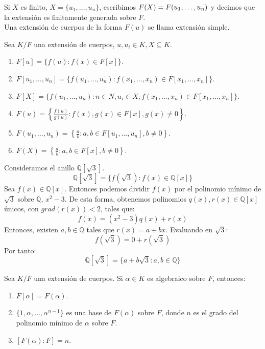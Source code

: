 \begin{definition}
    Si $X$ es finito, $X = \{u_1, \dots, u_n\}$, escribimos $F(X) =\\F(u_1, \dots, u_n)$ y decimos que la extensión es finitamente generada sobre $F$.\\
    Una extensión de cuerpos de la forma $F(u)$ se llama extensión simple.
\end{definition}

\begin{proposition}
    Sea $K/F$ una extensión de cuerpos, $u, u_i \in K, X \subseteq K$.
    \begin{enumerate}
        \item $F[u] = \{ f(u) : f(x) \in F[x] \}$.
        \item $F[u_1, \dots, u_n] = \{ f(u_1, \dots, u_n) : f(x_1, \dots, x_n) \in F[x_1, \dots, x_n] \}$.
        \item $F[X] = \{ f(u_1, \dots, u_n) : n \in N, u_i \in X, f(x_1, \dots, x_n) \in F[x_1, \dots, x_n] \}$.
        \item $F(u) = \left\{ \frac{f(u)}{g(u)} : f(x), g(x) \in F[x], g(x) \neq 0 \right\}$.
        \item $F(u_1, \dots, u_n) = \left\{ \frac{a}{b} : a, b \in F[u_1, \dots, u_n], b \neq 0 \right\}$.
        \item $F(X) = \left\{ \frac{a}{b} : a, b \in F[x], b \neq 0 \right\}$.
    \end{enumerate}
\end{proposition}

\begin{example}
    Consideramos el anillo $\mathbb{Q}[\sqrt{3}]$.
    $$\mathbb{Q}[\sqrt{3}] = \{ f(\sqrt{3}) : f(x) \in \mathbb{Q}[x] \}$$
    Sea $f(x) \in \mathbb{Q}[x]$. Entonces podemos dividir $f(x)$ por el polinomio mínimo de $\sqrt{3}$ sobre $\mathbb{Q}$, $x^2 - 3$. De esta forma, obtenemos polinomios $q(x), r(x) \in \mathbb{Q}[x]$ únicos, con $grad(r(x)) < 2$, tales que:
    $$f(x) = (x^2 - 3)q(x) + r(x)$$
    Entonces, existen $a, b \in \mathbb{Q}$ tales que $r(x) = a + bx$. Evaluando en $\sqrt{3}$:
    $$f(\sqrt{3}) = 0 + r(\sqrt{3})$$
    Por tanto:
    $$\mathbb{Q}[\sqrt{3}] = \{ a + b\sqrt{3} : a, b \in \mathbb{Q} \}$$
\end{example}

\begin{proposition}
    Sea $K/F$ una extensión de cuerpos. Si $\alpha \in K$ es algebraico sobre $F$, entonces:
    \begin{enumerate}
        \item $F[\alpha] = F(\alpha)$.
        \item $\{1, \alpha, \dots, \alpha^{n-1} \}$ es una base de $F(\alpha)$ sobre $F$, donde $n$ es el grado del polinomio mínimo de $\alpha$ sobre $F$.
        \item $[F(\alpha) : F] = n$.
    \end{enumerate}
\end{proposition}


